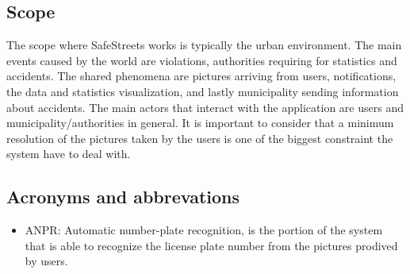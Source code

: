 \subsection{Scope}
The scope where SafeStreets works is typically the urban environment. The main events caused by the world are violations, authorities requiring for statistics and accidents.
The shared phenomena are pictures arriving from users, notifications, the data and statistics visualization, and lastly municipality sending information about accidents.  
The main actors that interact with the application are users and municipality/authorities in general.
It is important to consider that a minimum resolution of the pictures taken by the users is one of the biggest constraint the system have to deal with.
\subsection{Acronyms and abbrevations}
\begin{itemize}
	\item 
	 ANPR: Automatic number-plate recognition, is the portion of the system that is able to recognize the license plate number from the pictures prodived by users.
\end{itemize}